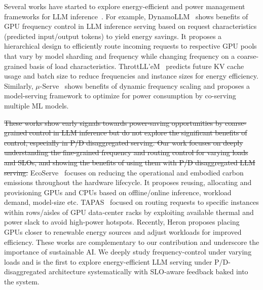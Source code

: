 Several works have started to explore energy-efficient and power management frameworks for LLM inference~\cite{stojkovic2025dynamollm,stojkovic2025tapas,li2025ecoserve,reddy2025ai,fernandez2025energy,stojkovic2024towards}.
For example, DynamoLLM~\cite{stojkovic2025dynamollm} shows benefits of GPU frequency control in LLM inference serving based on request characteristics (predicted input/output tokens) to yield energy savings.
It proposes a hierarchical design to efficiently route incoming requests to respective GPU pools that vary by model sharding and frequency while changing frequency on a coarse-grained basis of load characteristics.
ThrottLL'eM~\cite{kakolyris2025throttll} predicts future KV cache usage and batch size to reduce frequencies and instance sizes for energy efficiency.
Similarly, $\mu$-Serve~\cite{qiu2024power} shows benefits of dynamic frequency scaling and proposes a model-serving framework to optimize for power consumption by co-serving multiple ML models. 

\sout{
These works show early signals towards power-saving opportunities by coarse-grained control in LLM inference but do not explore the significant benefits of  control, especially in P/D disaggregated serving. Our work focuses on deeply understanding the fine-grained frequency and routing control for varying loads and SLOs, and showing the benefits of using them with P/D disaggregated LLM serving.}
EcoServe~\cite{li2025ecoserve} focuses on reducing the operational and embodied carbon emissions throughout the hardware lifecycle. It proposes reusing, allocating and provisioning GPUs and CPUs based on offline/online inference, workload demand, model-size etc. TAPAS~\cite{stojkovic2025tapas} focused on routing requests to specific instances within rows/aisles of GPU data‑center racks by exploiting available thermal and power slack to avoid high-power hotspots. Recently, Heron\cite{reddy2025ai} proposes placing GPUs closer to renewable energy sources and adjust workloads for improved efficiency. These works are complementary to our contribution and underscore the importance of sustainable AI.  
We deeply study frequency-control under varying loads and \name is the first to explore energy-efficient LLM serving under P/D-disaggregated architecture systematically with SLO-aware feedback baked into the system. 


